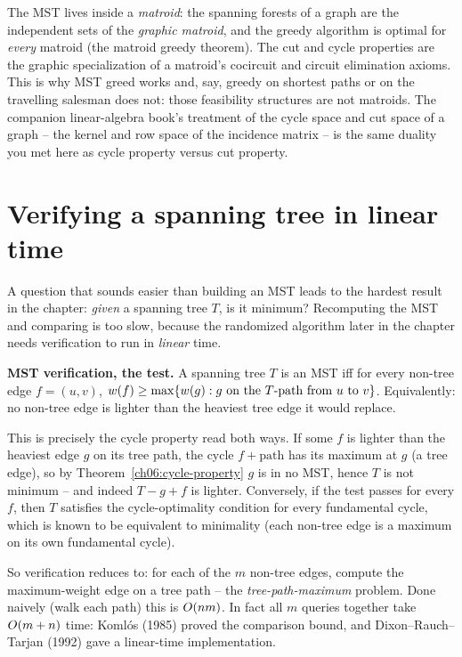 \begin{connectionbox}
The MST lives inside a \emph{matroid}: the spanning forests of a graph are the independent sets of the \emph{graphic matroid}, and the greedy algorithm is optimal for \emph{every} matroid (the matroid greedy theorem). The cut and cycle properties are the graphic specialization of a matroid's cocircuit and circuit elimination axioms. This is why MST greed works and, say, greedy on shortest paths or on the travelling salesman does not: those feasibility structures are not matroids. The companion linear-algebra book's treatment of the cycle space and cut space of a graph -- the kernel and row space of the incidence matrix -- is the same duality you met here as cycle property versus cut property.
\end{connectionbox}

\section{Verifying a spanning tree in linear time}
\label{ch06:verify}

A question that sounds easier than building an MST leads to the hardest result in the chapter: \emph{given} a spanning tree $T$, is it minimum? Recomputing the MST and comparing is too slow, because the randomized algorithm later in the chapter needs verification to run in \emph{linear} time.

\begin{focusbox}
\textbf{MST verification, the test.} A spanning tree $T$ is an MST iff for every non-tree edge $f=(u,v)$, $w(f)\ge\max\{w(g):g\text{ on the }T\text{-path from }u\text{ to }v\}$. Equivalently: no non-tree edge is lighter than the heaviest tree edge it would replace.
\end{focusbox}

\begin{whybox}
This is precisely the cycle property read both ways. If some $f$ is lighter than the heaviest edge $g$ on its tree path, the cycle $f+\text{path}$ has its maximum at $g$ (a tree edge), so by Theorem~\ref{ch06:cycle-property} $g$ is in no MST, hence $T$ is not minimum -- and indeed $T-g+f$ is lighter. Conversely, if the test passes for every $f$, then $T$ satisfies the cycle-optimality condition for every fundamental cycle, which is known to be equivalent to minimality (each non-tree edge is a maximum on its own fundamental cycle).
\end{whybox}

So verification reduces to: for each of the $m$ non-tree edges, compute the maximum-weight edge on a tree path -- the \emph{tree-path-maximum} problem. Done naively (walk each path) this is $O(nm)$. In fact all $m$ queries together take $O(m+n)$ time: Koml\'os (1985) proved the comparison bound, and Dixon--Rauch--Tarjan (1992) gave a linear-time implementation.

